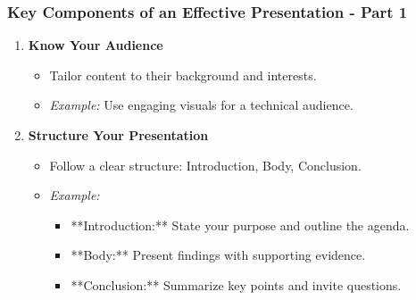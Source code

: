\documentclass[aspectratio=169]{beamer}
\begin{document}
\begin{frame}[fragile]
    \frametitle{Key Components of an Effective Presentation - Part 1}
    \begin{enumerate}
        \item \textbf{Know Your Audience}
        \begin{itemize}
            \item Tailor content to their background and interests.
            \item \textit{Example:} Use engaging visuals for a technical audience.
        \end{itemize}

        \item \textbf{Structure Your Presentation}
        \begin{itemize}
            \item Follow a clear structure: Introduction, Body, Conclusion.
            \item \textit{Example:}
                \begin{itemize}
                    \item **Introduction:** State your purpose and outline the agenda.
                    \item **Body:** Present findings with supporting evidence.
                    \item **Conclusion:** Summarize key points and invite questions.
                \end{itemize}
        \end{itemize}
    \end{enumerate}
\end{frame}
\end{document}
